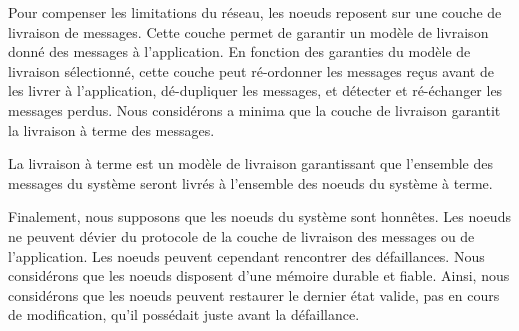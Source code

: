 Pour compenser les limitations du réseau, les noeuds reposent sur une couche de livraison de messages.
Cette couche permet de garantir un modèle de livraison donné des messages à l'application.
En fonction des garanties du modèle de livraison sélectionné, cette couche peut ré-ordonner les messages reçus avant de les livrer à l'application, dé-dupliquer les messages, et détecter et ré-échanger les messages perdus.
Nous considérons a minima que la couche de livraison garantit la livraison à terme des messages.

\begin{definition}
    La livraison à terme est un modèle de livraison garantissant que l'ensemble des messages du système seront livrés à l'ensemble des noeuds du système à terme.
\end{definition}

Finalement, nous supposons que les noeuds du système sont honnêtes.
Les noeuds ne peuvent dévier du protocole de la couche de livraison des messages ou de l'application.
Les noeuds peuvent cependant rencontrer des défaillances.
Nous considérons que les noeuds disposent d'une mémoire durable et fiable.
Ainsi, nous considérons que les noeuds peuvent restaurer le dernier état valide, \ie pas en cours de modification, qu'il possédait juste avant la défaillance.
